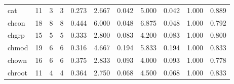\begin{longtable}{lp{1.8cm}p{1.8cm}p{1.8cm}p{1.8cm}p{1.8cm}p{1.8cm}p{1.8cm}p{1.8cm}p{1.8cm}p{1.8cm}}
cat       &                           11 &                  3 &                                 3 &                                      0.273 &                                  2.667 &                                        0.042 &                             5.000 &                                   0.042 &                              1.000 &                                              0.889 \\
chcon     &                           18 &                  8 &                                 8 &                                      0.444 &                                  6.000 &                                        0.048 &                             6.875 &                                   0.048 &                              1.000 &                                              0.792 \\
chgrp     &                           15 &                  5 &                                 5 &                                      0.333 &                                  2.800 &                                        0.083 &                             4.200 &                                   0.083 &                              1.000 &                                              0.800 \\
chmod     &                           19 &                  6 &                                 6 &                                      0.316 &                                  4.667 &                                        0.194 &                             5.833 &                                   0.194 &                              1.000 &                                              0.833 \\
chown     &                           16 &                  6 &                                 6 &                                      0.375 &                                  2.833 &                                        0.093 &                             4.000 &                                   0.093 &                              1.000 &                                              0.778 \\
chroot    &                           11 &                  4 &                                 4 &                                      0.364 &                                  2.750 &                                        0.068 &                             4.500 &                                   0.068 &                              1.000 &                                              0.833 \\

\end{longtable}
